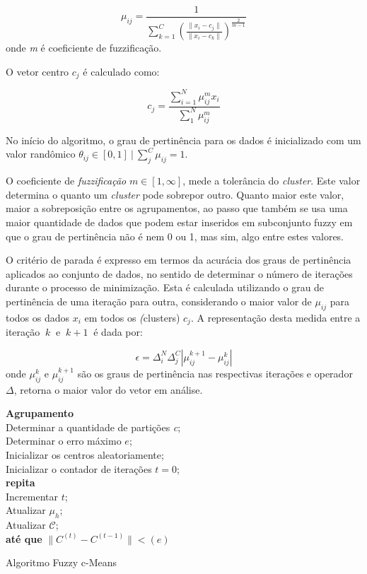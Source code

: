 \documentclass[12pt,a4paper]{article}
\numberwithin{equation}{section}
\begin{document}
{\begin{equation}
\mu_{ij}=\frac{1}{\sum_{k=1}^{C}(\frac{\lVert x_{i}-c_{j} \rVert}{\lVert x_{i}-c_{k} \rVert})^\frac{2}{m-1}}
\end{equation}
onde \textit{m} é coeficiente de fuzzificação.

O vetor centro $c_{j}$ é calculado como:

\begin{equation}
c_{j}=\frac{\sum_{i=1}^{N}\mu_{ij}^m x_{i}}{\sum_{1}^{N}\mu_{ij}^m}
\end{equation}

No início do algoritmo, o grau de pertinência para os dados é inicializado com um valor randômico $\theta_{ij}\in{[0,1]} ~|~\sum_{j}^{C}\mu_{ij}=1$.

O coeficiente de \textit{fuzzificação} $m \in [1,\infty]$, mede a tolerância do \textit{cluster}. Este valor determina o quanto um \textit{cluster} pode sobrepor outro. Quanto maior este valor, maior a sobreposição entre os agrupamentos, ao passo que também se usa uma maior quantidade de dados que podem estar inseridos em subconjunto fuzzy em que o grau de pertinência não é nem 0 ou 1, mas sim, algo entre estes valores.

O critério de parada é expresso em termos da acurácia dos graus de pertinência aplicados ao conjunto de dados, no sentido de determinar o número de iterações durante o processo de minimização. Esta é calculada utilizando o grau de pertinência de uma iteração para outra, considerando o maior valor de $\mu_{ij}$ para todos os dados $x_{i}$ em todos os \textit(clusters) $c_{j}$. A representação desta medida entre a iteração $~k~$ e $~k+1~$ é dada por:

\begin{equation}
\epsilon=\Delta_{i}^{N}\Delta_{j}^{C}|\mu_{ij}^{k+1} - \mu_{ij}^{k}| 
\end{equation}
onde $\mu_{ij}^{k}$ e $\mu_{ij}^{k+1}$ são os graus de pertinência nas respectivas iterações e operador $\Delta$, retorna o maior valor do vetor em análise.


\begin{algorithm}[H]
	\textbf{Agrupamento}\\
	Determinar a quantidade de partições \textit{c}; \\
	Determinar o erro máximo $e$;\\
	Inicializar os centros aleatoriamente;\\
	Inicializar o contador de iterações $t=0$;\\
	\textbf{repita}\\
	Incrementar $t$;\\
	Atualizar $\mu_{h}$;\\
	Atualizar $\mathcal{C}$;\\
	\textbf{até que} $\lVert C^{(t)}-C^{(t-1)} \rVert$$<(e)$
	\caption{Algoritmo Fuzzy c-Means}
\end{algorithm}



}
\end{document}
